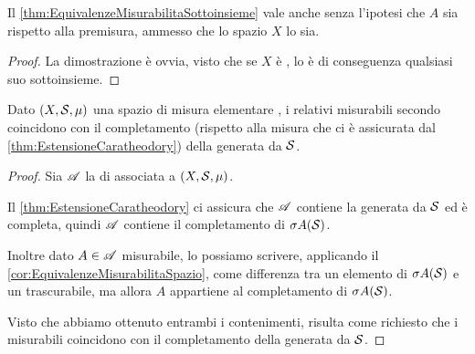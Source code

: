 \begin{corollary}\label{cor:EquivalenzeMisurabilitaSpazio}
	Il \cref{thm:EquivalenzeMisurabilitaSottoinsieme} vale anche senza l'ipotesi che $A$ sia \sigfin[o] rispetto alla premisura, ammesso che lo spazio $X$ lo sia.
\end{corollary}
\begin{proof}
	La dimostrazione è ovvia, visto che se $X$ è \sigfin[o], lo è di conseguenza qualsiasi suo sottoinsieme.
\end{proof}

\begin{proposition}\label{prop:CaratheodoryCompletamentoSigAlg}
	Dato $(X,\S,\mu)$ una spazio di misura elementare \sigfin[o], i relativi misurabili secondo \carat{} coincidono con il completamento (rispetto alla misura che ci è assicurata dal \cref{thm:EstensioneCaratheodory}) della \sigalg{} generata da $\S$.
\end{proposition}
\begin{proof}
	Sia $\A$ la \sigalg{} di \carat{} associata a $(X,\S,\mu)$.
	
	Il \cref{thm:EstensioneCaratheodory} ci assicura che $\A$ contiene la \sigalg{} generata da $\S$ ed è completa, quindi $\A$ contiene il completamento di $\sigma A(\S)$.
	
	Inoltre dato $A\in\A$ misurabile, lo possiamo scrivere, applicando il \cref{cor:EquivalenzeMisurabilitaSpazio}, come differenza tra un elemento di $\sigma A(\S)$ e un trascurabile, ma allora $A$ appartiene al completamento di $\sigma A(\S)$.
	
	Visto che abbiamo ottenuto entrambi i contenimenti, risulta come richiesto che i misurabili coincidono con il completamento della \sigalg{} generata da $\S$.
\end{proof}

